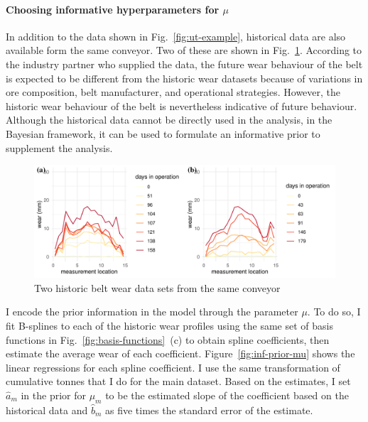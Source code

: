 \paragraph*{Choosing informative hyperparameters for $\mu$} In addition to the data shown in Fig.~\ref{fig:ut-example}, historical data are also available form the same conveyor. Two of these are shown in Fig.~\ref{fig:previouse-belts}. According to the industry partner who supplied the data, the future wear behaviour of the belt is expected to be different from the historic wear datasets because of variations in ore composition, belt manufacturer, and operational strategies. However, the historic wear behaviour of the belt is nevertheless indicative of future behaviour. Although the historical data cannot be directly used in the analysis, in the Bayesian framework, it can be used to formulate an informative prior to supplement the analysis.

\begin{figure}
  \centering
  \includegraphics[width=\textwidth]{figures/ch-6/historic_belts.pdf}
  \caption{Two historic belt wear data sets from the same conveyor}
  \label{fig:previouse-belts}
\end{figure}

I encode the prior information in the model through the parameter $\mu$. To do so, I fit B-splines to each of the historic wear profiles using the same set of basis functions in Fig.~\ref{fig:basis-functions}~(c) to obtain spline coefficients, then estimate the average wear of each coefficient. Figure~\ref{fig:inf-prior-mu} shows the linear regressions for each spline coefficient. I use the same transformation of cumulative tonnes that I do for the main dataset. Based on the estimates, I set $\hat{a}_m$ in the prior for $\mu_m$ to be the estimated slope of the coefficient based on the historical data and $\hat{b}_m$ as five times the standard error of the estimate.

